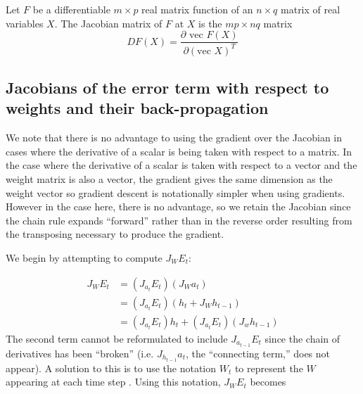 \begin{definition}
  Let $F$ be a differentiable $m \times p$ real matrix function of an $n \times q$ matrix of real variables $X$. The Jacobian matrix of $F$ at $X$ is the $mp \times nq$ matrix
\begin{equation*}
  D F(X) = \frac{\partial \mbox{ vec } F(X)}{\partial (\mbox{vec } X)^T}
\end{equation*}
\end{definition}

\subsection{Jacobians of the error term with respect to weights and their back-propagation}

We note that there is no advantage to using the gradient over the Jacobian in cases where the derivative of a scalar is being taken with respect to a matrix. In the case where the derivative of a scalar is taken with respect to a vector and the weight matrix is also a vector, the gradient gives the same dimension as the weight vector so gradient descent is notationally simpler when using gradients. However in the case here, there is no advantage, so we retain the Jacobian since the chain rule expands ``forward'' rather than in the reverse order resulting from the transposing necessary to produce the gradient.

We begin by attempting to compute $J_{W} E_t$:

\begin{align*}
  J_{W} E_t & = (J_{a_t} E_t)(J_W a_t) \\
  & = (J_{a_t} E_t)(h_t + J_W h_{t-1}) \\
  & = (J_{a_t} E_t)h_t + (J_{a_t} E_t)(J_w h_{t-1})
\end{align*}
%
The second term cannot be reformulated to include $J_{a_{t-1}} E_t$ since the chain of derivatives has been ``broken'' (i.e. $J_{h_{t-1}} a_t$, the ``connecting term,'' does not appear). A solution to this is to use the notation $W_t$ to represent the $W$ appearing at each time step \cite[p. 386]{Goodfellow-et-al-2016}. Using this notation, $J_{W} E_t$ becomes

